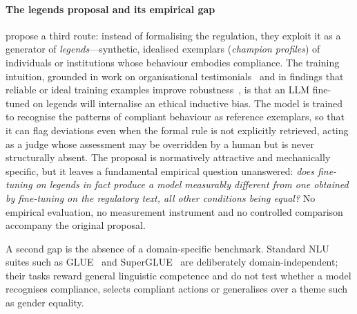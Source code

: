 \documentclass[pdflatex, sn-apa]{sn-jnl}%
\theoremstyle{thmstyleone}%
\theoremstyle{thmstyletwo}%
\theoremstyle{thmstylethree}%
\begin{document}
\paragraph{The legends proposal and its empirical gap}
\citet{sargsyan2025legends} propose a third route: instead of formalising the
regulation, they exploit it as a generator of \emph{legends}---synthetic,
idealised exemplars (\emph{champion profiles}) of individuals or institutions
whose behaviour embodies compliance. The training intuition, grounded in work on
organisational testimonials~\citep{kanyamukenge2024testimonials} and in findings
that reliable or ideal training examples improve
robustness~\citep{northcutt2017cleaning}, is that an LLM fine-tuned on legends
will internalise an ethical inductive bias. The model is trained to recognise the
patterns of compliant behaviour as reference exemplars, so that it can flag
deviations even when the formal rule is not explicitly retrieved, acting as a
judge whose assessment may be overridden by a human but is never structurally
absent. The proposal is normatively attractive and mechanically specific, but it
leaves a fundamental empirical question unanswered: \emph{does fine-tuning on
legends in fact produce a model measurably different from one obtained by
fine-tuning on the regulatory text, all other conditions being equal?} No
empirical evaluation, no measurement instrument and no controlled comparison
accompany the original proposal.

A second gap is the absence of a domain-specific benchmark. Standard NLU suites
such as GLUE~\citep{wang2018glue} and SuperGLUE~\citep{wang2019superglue} are
deliberately domain-independent; their tasks reward general linguistic competence
and do not test whether a model recognises compliance, selects compliant actions
or generalises over a theme such as gender equality.

\end{document}
